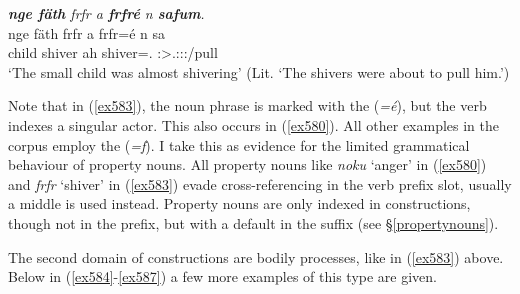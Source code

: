 \begin{exe}
	\ex \emph{\textbf{nge fäth} frfr a \textbf{frfré} n \textbf{safum}.}\\
	\gll nge fäth frfr a frfr=é n sa\\
	child \Dim{} shiver ah shiver=\Erg.\Nsg{} \Imn{} \Stsg:\Sbj>\Tsg.\Masc:\Obj:\Rpst:\Pfv/pull\\
	\trans `The small child was almost shivering' (Lit. `The shivers were about to pull him.')
	\label{ex583}
\end{exe}

Note that in (\ref{ex583}), the noun phrase is marked with the   (\emph{=é}), but the verb indexes a singular actor. This also occurs in (\ref{ex580}). All other examples in the corpus employ the   (\emph{=f}). I take this as evidence for the limited grammatical behaviour of property nouns. All property nouns \textendash{} like \emph{noku} `anger' in (\ref{ex580}) and \emph{frfr} `shiver' in (\ref{ex583}) \textendash{} evade cross-referencing in the verb prefix slot, usually a middle is used instead. Property nouns are only indexed in  constructions, though not in the prefix, but with a default \Stsg{} in the suffix (see \S{}\ref{propertynouns}).%

The second domain of  constructions are bodily processes, like in (\ref{ex583}) above. Below in (\ref{ex584}-\ref{ex587}) a few more examples of this type are given.

